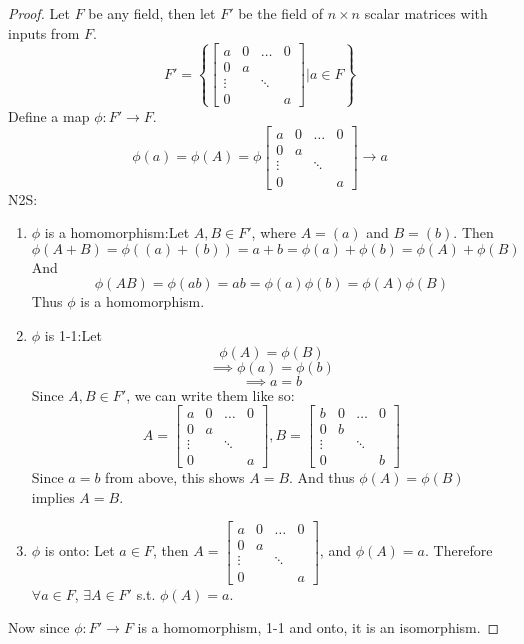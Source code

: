 \documentclass[hidelinks,12pt]{article}
\begin{document}
\begin{itemize}
\begin{proof}
    Let $F$ be any field, then let $F'$ be the field of $n\times n$ scalar matrices with inputs from $F$. $$F'=\left\{\begin{bmatrix}
    a & 0 & \dots & 0 \\
    0 & a \\
    \vdots && \ddots \\
    0 &&& a
    \end{bmatrix}|a\in F\right\}$$
    Define a map $\phi:F'\to F$. $$\phi(a)=\phi(A)=\phi\begin{bmatrix}
    a & 0 & \dots & 0 \\
    0 & a \\
    \vdots && \ddots \\
    0 &&& a
    \end{bmatrix}\longrightarrow a$$
    N2S:\begin{enumerate}
        \item $\phi$ is a homomorphism:\newline Let $A,B\in F'$, where $A=(a)$ and $B=(b)$. Then $$\phi(A+B)=\phi((a)+(b))=a+b=\phi(a)+\phi(b)=\phi(A)+\phi(B)$$ And $$\phi(AB)=\phi(ab)=ab=\phi(a)\phi(b)=\phi(A)\phi(B)$$ Thus $\phi$ is a homomorphism.
        \item $\phi$ is 1-1:\newline Let $$\phi(A)=\phi(B)$$ $$\implies\phi(a)=\phi(b)$$ $$\implies a=b$$ Since $A,B\in F'$, we can write them like so: $$A=\begin{bmatrix}
    a & 0 & \dots & 0 \\
    0 & a \\
    \vdots && \ddots \\
    0 &&& a
    \end{bmatrix}, B=\begin{bmatrix}
    b & 0 & \dots & 0 \\
    0 & b \\
    \vdots && \ddots \\
    0 &&& b
    \end{bmatrix}$$ Since $a=b$ from above, this shows $A=B$. And thus $\phi(A)=\phi(B)$ implies $A=B$.
        \item $\phi$ is onto: Let $a\in F$, then $A=\begin{bmatrix}
    a & 0 & \dots & 0 \\
    0 & a \\
    \vdots && \ddots \\
    0 &&& a
    \end{bmatrix}$, and $\phi(A)=a$. Therefore $\forall a\in F$, $\exists A\in F'$ s.t. $\phi(A)=a$.
    \end{enumerate}
    Now since $\phi:F'\to F$ is a homomorphism, 1-1 and onto, it is an isomorphism.
    \end{proof}
\end{itemize}
\end{document}
